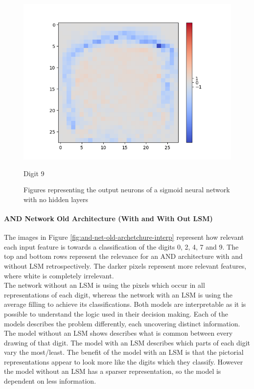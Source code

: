 \begin{figure}[H]
\begin{minipage}[b]{0.19\textwidth}
		\includegraphics[width=\textwidth]{Sigmoid(NO-Hidden)/Layer0-Neuron-9.png}
		\caption{Digit 9}
	\end{minipage}
	\hfill
	\caption{Figures representing the output neurons of a sigmoid neural network with no hidden layers}
	\label{fig:sigmoid-weights-no-hidden-layer}
\end{figure}


\paragraph{AND Network Old Architecture (With and With Out LSM)}
The images in Figure \ref{fig:and-net-old-archetchure-interp} represent how relevant each input feature is towards a classification of the digits 0, 2, 4, 7 and 9. The top and bottom rows represent the relevance for an AND architecture with and without LSM retrospectively. The darker pixels represent more relevant features, where white is completely irrelevant.\\

The network without an LSM is using the pixels which occur in all representations of each digit, whereas the network with an LSM is using the average filling to achieve its classifications. Both models are interpretable as it is possible to understand the logic used in their decision making. Each of the models describes the problem differently, each uncovering distinct information. The model without an LSM shows describes what is common between every drawing of that digit. The model with an LSM describes which parts of each digit vary the most/least. The benefit of the model with an LSM is that the pictorial representations appear to look more like the digits which they classify. However the model without an LSM has a sparser representation, so the model is dependent on less information.

